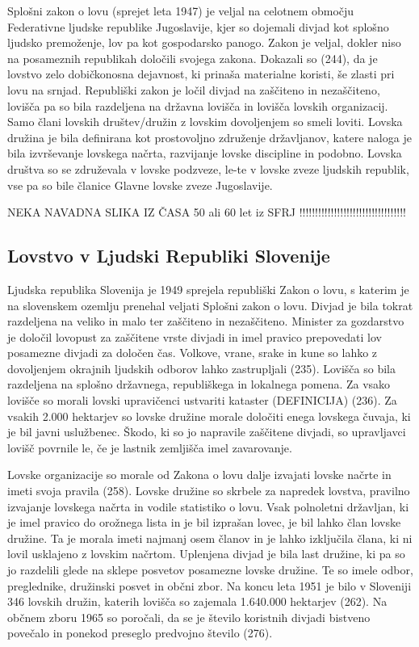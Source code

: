 \documentclass[a4paper,12pt,openright]{book}
\begin{document}
Splošni zakon o lovu (sprejet leta 1947) je veljal na celotnem območju Federativne ljudske republike Jugoslavije, kjer so dojemali divjad kot splošno ljudsko premoženje, lov pa kot gospodarsko panogo. 
Zakon je veljal, dokler niso na posameznih republikah določili svojega zakona.
Dokazali so (244), da je lovstvo zelo dobičkonosna dejavnost, ki prinaša materialne koristi, še zlasti pri lovu na srnjad.
Republiški zakon je ločil divjad na zaščiteno in nezaščiteno, lovišča pa so bila razdeljena na državna lovišča in lovišča lovskih organizacij.
Samo člani lovskih društev/družin z lovskim dovoljenjem so smeli loviti. 
Lovska družina je bila definirana kot prostovoljno združenje državljanov, katere naloga je bila izvrševanje lovskega načrta, razvijanje lovske discipline in podobno. 
Lovska društva so se združevala v lovske podzveze, le-te v lovske zveze ljudskih republik, vse pa so bile članice Glavne lovske zveze Jugoslavije.

NEKA NAVADNA SLIKA IZ ČASA 50 ali 60 let iz SFRJ !!!!!!!!!!!!!!!!!!!!!!!!!!!!!!!!!!

\subsection{Lovstvo v Ljudski Republiki Slovenije}

Ljudska republika Slovenija je 1949 sprejela republiški Zakon o lovu, s katerim je na slovenskem ozemlju prenehal veljati Splošni zakon o lovu.
Divjad je bila tokrat razdeljena na veliko in malo ter zaščiteno in nezaščiteno. 
Minister za gozdarstvo je določil lovopust za zaščitene vrste divjadi in imel pravico prepovedati lov posamezne divjadi za določen čas. 
Volkove, vrane, srake in kune so lahko z dovoljenjem okrajnih ljudskih odborov lahko zastrupljali (235).
Lovišča so bila razdeljena na splošno državnega, republiškega in lokalnega pomena. 
Za vsako lovišče so morali lovski upravičenci ustvariti kataster (DEFINICIJA) (236). 
Za vsakih 2.000 hektarjev so lovske družine morale določiti enega lovskega čuvaja, ki je bil javni uslužbenec. 
Škodo, ki so jo napravile zaščitene divjadi, so upravljavci lovišč povrnile le, če je lastnik zemljišča imel zavarovanje.  

Lovske organizacije so morale od Zakona o lovu dalje izvajati lovske načrte in imeti svoja pravila (258). 
Lovske družine so skrbele za napredek lovstva, pravilno izvajanje lovskega načrta in vodile statistiko o lovu. 
Vsak polnoletni državljan, ki je imel pravico do orožnega lista in je bil izprašan lovec, je bil lahko član lovske družine. 
Ta je morala imeti najmanj osem članov in je lahko izključila člana, ki ni lovil usklajeno z lovskim načrtom. 
Uplenjena divjad je bila last družine, ki pa so jo razdelili glede na sklepe posvetov posamezne lovske družine. 
Te so imele odbor, preglednike, družinski posvet in občni zbor. 
Na koncu leta 1951 je bilo v Sloveniji 346 lovskih družin, katerih lovišča so zajemala 1.640.000 hektarjev (262).
Na občnem zboru 1965 so poročali, da se je število koristnih divjadi bistveno povečalo in ponekod preseglo predvojno število (276).
\end{document}
